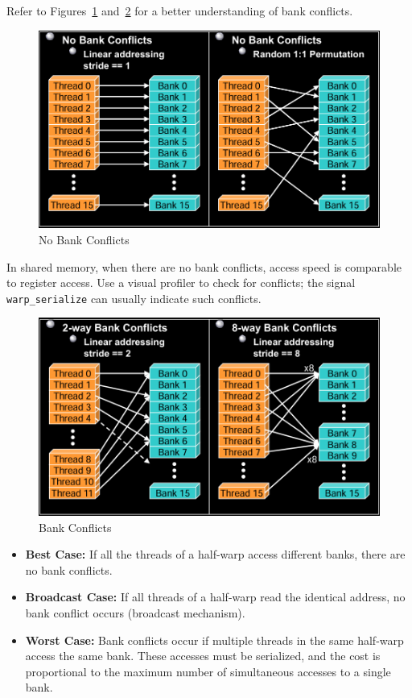 \documentclass[12pt]{book}
\begin{document}
Refer to Figures~\ref{fig:nobankconf} and~\ref{fig:bankconf} for a better understanding of bank conflicts.
\begin{figure}[ht]
    \centering
    \includegraphics[width=0.75\linewidth]{images/NoBankConflicts.png}
    \caption{No Bank Conflicts}
    \label{fig:nobankconf}
\end{figure}
In shared memory, when there are no bank conflicts, access speed is comparable to register access. Use a visual profiler to check for conflicts; the signal \texttt{warp\_serialize} can usually indicate such conflicts.
\begin{figure}[ht]
    \centering
    \includegraphics[width=0.75\linewidth]{images/BankConflicts.png}
    \caption{Bank Conflicts}
    \label{fig:bankconf}
\end{figure}
\begin{itemize}
    \item \textbf{Best Case:} If all the threads of a half-warp access different banks, there are no bank conflicts.
    \item \textbf{Broadcast Case:} If all threads of a half-warp read the identical address, no bank conflict occurs (broadcast mechanism).
    \item \textbf{Worst Case:} Bank conflicts occur if multiple threads in the same half-warp access the same bank. These accesses must be serialized, and the cost is proportional to the maximum number of simultaneous accesses to a single bank.
\end{itemize}
\end{document}
